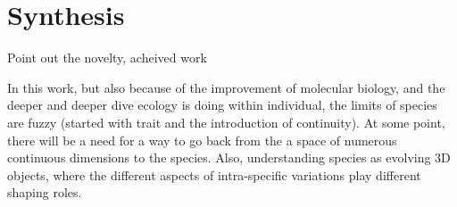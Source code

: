 

\chapter{Synthesis}

Point out the novelty, acheived work 




In this work, but also because of the improvement of molecular biology, and the deeper and deeper dive ecology is doing within individual, the limits of species are fuzzy (started with trait and the introduction of continuity). At some point, there will be a need for a way to go back from the a space of numerous continuous dimensions to the species. Also, understanding species as evolving 3D objects, where the different aspects of intra-specific variations play different shaping roles.